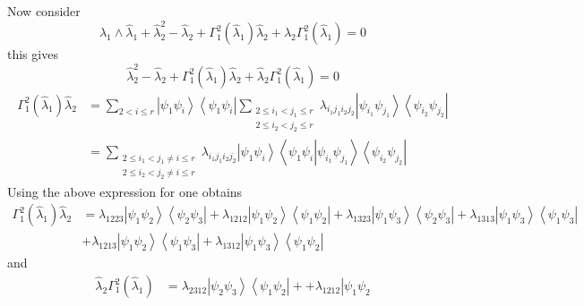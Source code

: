 \documentclass[aps,preprint]{revtex4}%
\begin{document}
\begin{itemize}
Now consider
\begin{equation}
\hat{\lambda}_{1}\wedge\hat{\lambda}_{1}+\hat{\lambda}_{2}^{2}-\hat{\lambda
}_{2}+\Gamma_{1}^{2}\left(  \hat{\lambda}_{1}\right)  \hat{\lambda}_{2}%
+\hat{\lambda}_{2}\Gamma_{1}^{2}\left(  \hat{\lambda}_{1}\right)  =0
\end{equation}
this gives
\begin{equation}
\hat{\lambda}_{2}^{2}-\hat{\lambda}_{2}+\Gamma_{1}^{2}\left(  \hat{\lambda
}_{1}\right)  \hat{\lambda}_{2}+\hat{\lambda}_{2}\Gamma_{1}^{2}\left(
\hat{\lambda}_{1}\right)  =0
\end{equation}%
\begin{align}
\Gamma_{1}^{2}\left(  \hat{\lambda}_{1}\right)  \hat{\lambda}_{2}  &
=\sum_{2<i\leq r}\left\vert \psi_{1}\psi_{i}\right\rangle \left\langle
\psi_{1}\psi_{i}\right\vert \sum_{\substack{2\leq i_{1}<j_{1}\leq r\\2\leq
i_{2}<j_{2}\leq r}}\lambda_{i_{1}j_{1}i_{2}j_{2}}\left\vert \psi_{i_{1}}%
\psi_{j_{1}}\right\rangle \left\langle \psi_{i_{2}}\psi_{j_{2}}\right\vert \\
&  =\sum_{\substack{2\leq i_{1}<j_{1}\neq i\leq r\\2\leq i_{2}<j_{2}\neq i\leq
r}}\lambda_{i_{1}j_{1}i_{2}j_{2}}\left\vert \psi_{1}\psi_{i}\right\rangle
\left\langle \psi_{1}\psi_{i}\left\vert \psi_{i_{1}}\psi_{j_{1}}\right.
\right\rangle \left\langle \psi_{i_{2}}\psi_{j_{2}}\right\vert
\end{align}
Using the above expression for one obtains
\begin{align}
\Gamma_{1}^{2}\left(  \hat{\lambda}_{1}\right)  \hat{\lambda}_{2}  &
=\lambda_{1223}\left\vert \psi_{1}\psi_{2}\right\rangle \left\langle \psi
_{2}\psi_{3}\right\vert +\lambda_{1212}\left\vert \psi_{1}\psi_{2}%
\right\rangle \left\langle \psi_{1}\psi_{2}\right\vert +\lambda_{1323}%
\left\vert \psi_{1}\psi_{3}\right\rangle \left\langle \psi_{2}\psi
_{3}\right\vert +\lambda_{1313}\left\vert \psi_{1}\psi_{3}\right\rangle
\left\langle \psi_{1}\psi_{3}\right\vert \nonumber\\
&  +\lambda_{1213}\left\vert \psi_{1}\psi_{2}\right\rangle \left\langle
\psi_{1}\psi_{3}\right\vert +\lambda_{1312}\left\vert \psi_{1}\psi
_{3}\right\rangle \left\langle \psi_{1}\psi_{2}\right\vert
\end{align}
and
\begin{align}
\hat{\lambda}_{2}\Gamma_{1}^{2}\left(  \hat{\lambda}_{1}\right)   &
=\lambda_{2312}\left\vert \psi_{2}\psi_{3}\right\rangle \left\langle \psi
_{1}\psi_{2}\right\vert ++\lambda_{1212}\left\vert \psi_{1}\psi_{2}%

\end{align}
\end{itemize}
\end{document}
